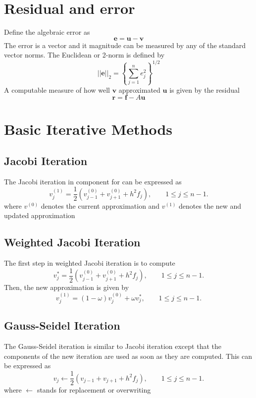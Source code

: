 \documentclass[a4paper]{report}
\begin{document}
	\section{Residual and error}
	
	Define the algebraic error as $$ \mathbf{e} = \mathbf{u} - \mathbf{v} $$
	The error is a vector and it magnitude can be measured by any of the standard vector norms.
	The Euclidean or 2-norm is defined by 
	$$ || \mathbf{e} ||_2 = 	\left\lbrace \sum_{j=1}^n e^2_j \right\rbrace^{1/2} $$
	A computable measure of how well $\mathbf{v}$ approximated $\mathbf{u}$ is given by the residual
	$$ \mathbf{r} = \mathbf{f} - A\mathbf{u} $$
	
	\section{Basic Iterative Methods} \label{iter}
	
	\subsection{Jacobi Iteration}
	The Jacobi iteration in component for can be expressed as
	\begin{equation}
	v_j^{(1)} = \frac{1}{2}\left( v_{j-1}^{(0)} + v_{j+1}^{(0)} + h^2 f_j \right), \qquad 1 \leq j \leq n-1.
	\end{equation}
	where $v^{(0)}$ denotes the current approximation and $v^{(1)}$ denotes the new and updated approximation

	\subsection{Weighted Jacobi Iteration}
	The first step in weighted Jacobi iteration is to compute
	$$
	v_j^{*} = \frac{1}{2}\left( v_{j-1}^{(0)} + v_{j+1}^{(0)} + h^2 f_j \right), \qquad 1 \leq j \leq n-1.
	$$
	Then, the new approximation is given by
	\begin{equation}
	v_j^{(1)} = (1-\omega) v_{j}^{(0)} + \omega v_{j}^{*}, \qquad 1 \leq j \leq n-1.
	\end{equation}
	
	\subsection{Gauss-Seidel Iteration}
	The Gauss-Seidel iteration is similar to Jacobi iteration except that the components of the new iteration are used as soon as they are computed.
	This can be expressed as 
	\begin{equation}
	v_j \longleftarrow \frac{1}{2}\left( v_{j-1} + v_{j+1} + h^2 f_j \right), \qquad 1 \leq j \leq n-1.
	\end{equation}
	where $\longleftarrow$ stands for replacement or overwriting
	
\end{document}
